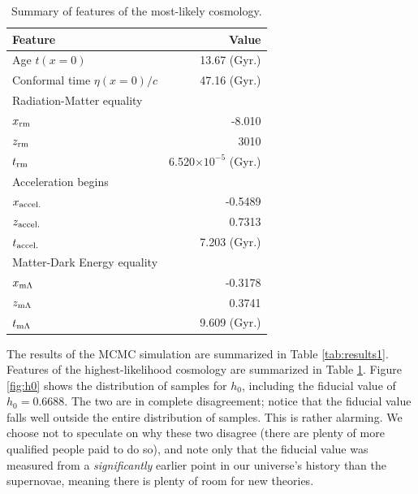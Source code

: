 \documentclass[aps,prl,twocolumn,groupedaddress,nofootinbib]{revtex4-2}
\begin{document}
\begin{table}
    \vspace{1em}
    \begin{ruledtabular}
        \caption{\label{tab:best}Summary of features of the most-likely cosmology.}
        \begin{tabular}{l r}
            Feature                      & Value                       \\
            \hline
            Age $t(x=0)$                 & 13.67 (Gyr.)                \\
            Conformal time $\eta(x=0)/c$ & 47.16 (Gyr.)                \\
            \hline
            \footnotesize{Radiation-Matter equality}                   \\
            $x_{\rm rm}$                 & -8.010                      \\
            $z_{\rm rm}$                 & 3010                        \\
            $t_{\rm rm}$                 & 6.520$\times10^{-5}$ (Gyr.) \\
            \hline
            \footnotesize{Acceleration begins}                         \\
            $x_{\rm accel.}$             & -0.5489                     \\
            $z_{\rm accel.}$             & 0.7313                      \\
            $t_{\rm accel.}$             & 7.203 (Gyr.)                \\
            \hline
            \footnotesize{Matter-Dark Energy equality}                 \\
            $x_{\rm m\Lambda}$           & -0.3178                     \\
            $z_{\rm m\Lambda}$           & 0.3741                      \\
            $t_{\rm m\Lambda}$           & 9.609 (Gyr.)                \\
        \end{tabular}
    \end{ruledtabular}
\end{table}

The results of the MCMC simulation are summarized in Table \ref{tab:results1}. Features of the highest-likelihood cosmology are summarized in Table \ref{tab:best}. Figure \ref{fig:h0} shows the distribution of samples for $h_0$, including the fiducial value of $h_0=0.6688$. The two are in complete disagreement; notice that the fiducial value falls well outside the entire distribution of samples. This is rather alarming. We choose not to speculate on why these two disagree (there are plenty of more qualified people paid to do so), and note only that the fiducial value was measured from a \textit{significantly} earlier point in our universe's history than the supernovae, meaning there is plenty of room for new theories.
\end{document}
